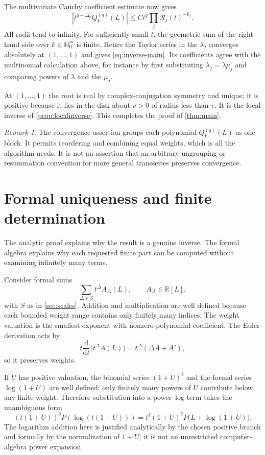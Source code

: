 \documentclass[11pt,a4paper]{article}
\theoremstyle{definition}
\theoremstyle{remark}
\newtheorem{remark}[theorem]{Remark}
\newcommand{\NN}{\mathbb N_0}
\newcommand{\RR}{\mathbb R}
\newcommand{\dd}{\mathrm d}
\begin{document}
The multivariate Cauchy coefficient estimate now gives
\begin{equation}\label{eq:multi-cauchy}
 \left|t^{q+\Delta_k}Q_k^{(q)}(L)\right|
 \le C t^q\prod_j\mathcal R_j(t)^{-k_j}.
\end{equation}
All radii tend to infinity. For sufficiently small $t$, the geometric sum of
the right-hand side over $k\in\NN^m$ is finite. Hence the Taylor series in the
$\lambda_j$ converges absolutely at $(1,\ldots,1)$ and gives
\eqref{eq:inverse-main}. Its coefficients agree with the multinomial
calculation above, for instance by first substituting
$\lambda_j=\lambda\mu_j$ and comparing powers of $\lambda$ and the $\mu_j$.

At $(1,\ldots,1)$ the root is real by complex-conjugation symmetry and unique;
it is positive because it lies in the disk about $v>0$ of radius less than $v$.
It is the local inverse of \cref{prop:localinverse}. This completes the proof
of \cref{thm:main}.

\begin{remark}
The convergence assertion groups each polynomial $Q_k^{(q)}(L)$ as one block.
It permits reordering and combining equal weights, which is all the algorithm
needs. It is not an assertion that an arbitrary ungrouping or resummation
convention for more general transseries preserves convergence.
\end{remark}

\section{Formal uniqueness and finite determination}
\label{sec:formal}

The analytic proof explains why the result is a genuine inverse. The formal
algebra explains why each requested finite part can be computed without
examining infinitely many terms.

Consider formal sums
\[
 \sum_{\Delta\in S}t^\Delta A_\Delta(L),\qquad A_\Delta\in\RR[L],
\]
with $S$ as in \cref{sec:scales}. Addition and multiplication are well defined
because each bounded weight range contains only finitely many indices.
The weight valuation is the smallest exponent with nonzero polynomial
coefficient. The Euler derivation acts by
\[
 t\frac{\dd}{\dd t}\bigl(t^\Delta A(L)\bigr)
   =t^\Delta(\Delta A+A'),
\]
so it preserves weights.

If $U$ has positive valuation, the binomial series $(1+U)^b$ and the formal
series $\log(1+U)$ are well defined: only finitely many powers of $U$ contribute
below any finite weight. Therefore substitution into a power--log term takes
the unambiguous form
\begin{equation}\label{eq:formalcomposition}
 (t(1+U))^\delta P(\log(t(1+U)))
 =t^\delta(1+U)^\delta P\bigl(L+\log(1+U)\bigr).
\end{equation}
The logarithm addition here is justified analytically by the chosen positive
branch and formally by the normalization of $1+U$; it is not an unrestricted
computer-algebra power expansion.
\end{document}
